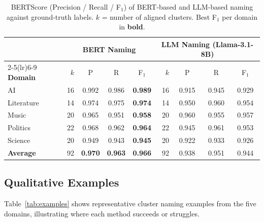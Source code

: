 \documentclass[11pt,a4paper]{article}
\begin{document}
\begin{table}[h]
\centering
\caption{BERTScore (Precision / Recall / F$_1$) of BERT-based and
LLM-based naming against ground-truth labels.
$k$ = number of aligned clusters.
Best F$_1$ per domain in \textbf{bold}.}
\label{tab:bertscore}
\setlength{\tabcolsep}{5pt}
\begin{tabular}{l r ccc r ccc}
\toprule
& \multicolumn{4}{c}{\cellcolor{bertcolor}\textbf{BERT Naming}}
& \multicolumn{4}{c}{\cellcolor{llmcolor}\textbf{LLM Naming (Llama-3.1-8B)}} \\
\cmidrule(lr){2-5}\cmidrule(lr){6-9}
\textbf{Domain} & $k$ & P & R & F$_1$ & $k$ & P & R & F$_1$ \\
\midrule
AI         & 16 & 0.992 & 0.986 & \textbf{0.989} & 16 & 0.915 & 0.945 & 0.929 \\
Literature & 14 & 0.974 & 0.975 & \textbf{0.974} & 14 & 0.950 & 0.960 & 0.954 \\
Music      & 20 & 0.965 & 0.951 & \textbf{0.958} & 20 & 0.960 & 0.955 & 0.957 \\
Politics   & 22 & 0.968 & 0.962 & \textbf{0.964} & 22 & 0.945 & 0.961 & 0.953 \\
Science    & 20 & 0.949 & 0.943 & \textbf{0.945} & 20 & 0.922 & 0.933 & 0.926 \\
\midrule
\textbf{Average} & 92 & \textbf{0.970} & \textbf{0.963} & \textbf{0.966}
                 & 92 & 0.938 & 0.951 & 0.944 \\
\bottomrule
\end{tabular}
\end{table}

\subsection{Qualitative Examples}

Table~\ref{tab:examples} shows representative cluster naming examples
from the five domains, illustrating where each method succeeds or struggles.
\end{document}
